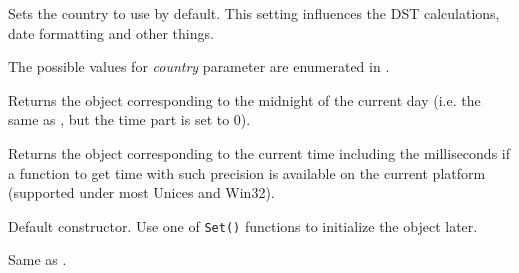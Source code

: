 
Sets the country to use by default. This setting influences the DST
calculations, date formatting and other things.

The possible values for {\it country} parameter are enumerated in
.



\label{wxdatetimetoday}


Returns the object corresponding to the midnight of the current day (i.e. the
same as , but the time part is set to $0$).



\label{wxdatetimeunow}


Returns the object corresponding to the current time including the
milliseconds if a function to get time with such precision is available on the
current platform (supported under most Unices and Win32).




\label{wxdatetimewxdatetimedef}


Default constructor. Use one of {\tt Set()} functions to initialize the object
later.

\label{wxdatetimewxdatetimetimet}


Same as .


\label{wxdatetimewxdatetimetm}


